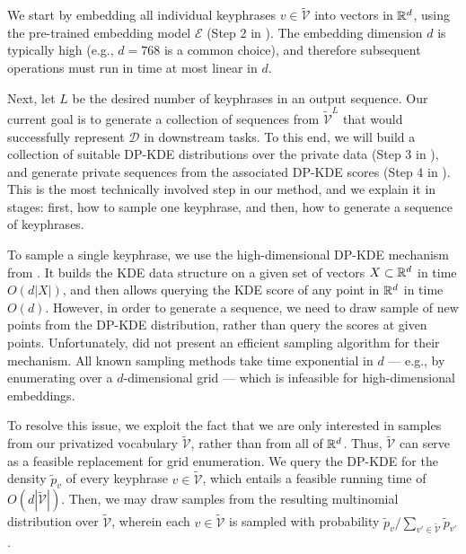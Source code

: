 We start by embedding all individual keyphrases $v\in\widetilde{\mathcal{V}}$ into vectors in $\mathbb R^d$, using the pre-trained embedding model $\mathcal{E}$ (Step 2 in ). The embedding dimension $d$ is typically high (e.g., $d=768$ is a common choice), and therefore subsequent operations must run in time at most linear in $d$.

Next, let $L$ be the desired number of keyphrases in an output sequence. Our current goal is to generate a collection of sequences from $\widetilde{\mathcal{V}}^L$ that would successfully represent $\mathcal{D}$ in downstream tasks. 
%
To this end, we will build a collection of suitable DP-KDE distributions over the private data (Step 3 in ), and generate private sequences from the associated DP-KDE scores (Step 4 in ). 
This is the most technically involved step in our method, and we explain it in stages: first, how to sample one keyphrase, and then, how to generate a sequence of keyphrases. 

To sample a single keyphrase, we use the high-dimensional DP-KDE mechanism from \cite{wagner2023fast}. It builds the KDE data structure on a given set of vectors $X\subset\mathbb R^d$ in time $O(d|X|)$, and then allows querying the KDE score of any point in $\mathbb R^d$ in time $O(d)$. 
%
However, in order to generate a sequence, we need to draw sample of new points from the DP-KDE distribution, rather than query the scores at given points. 
Unfortunately, \cite{wagner2023fast} did not present an efficient sampling algorithm for their mechanism. All known sampling methods take time exponential in $d$ --- e.g., by enumerating over a $d$-dimensional grid --- which is infeasible for high-dimensional embeddings. 

To resolve this issue, 
we exploit the fact that we are only interested in samples from our privatized vocabulary $\widetilde{\mathcal{V}}$, rather than from all of $\mathbb R^d$. 
Thus, $\widetilde{\mathcal{V}}$ can serve as a feasible replacement for grid enumeration. 
We query the DP-KDE for the density $\tilde p_v$ of every keyphrase $v\in\widetilde{\mathcal{V}}$, which entails a feasible running time of $O(d|\widetilde{\mathcal{V}}|)$. Then, we may draw samples from the resulting multinomial distribution over $\widetilde{\mathcal{V}}$, wherein each $v\in \widetilde{\mathcal{V}}$ is sampled with probability $\tilde p_v/\sum_{v'\in\widetilde{\mathcal{V}}}\tilde p_{v'}$.

